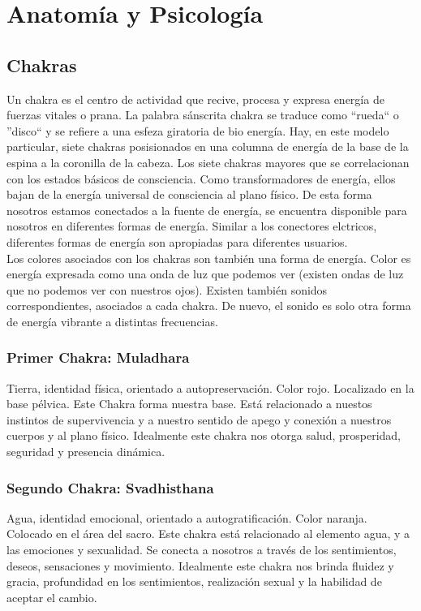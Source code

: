 \chapter{Anatomía y Psicología}
\section{Chakras}
Un chakra es el centro de actividad que recive, procesa y expresa energía de fuerzas vitales o prana. La palabra sánscrita chakra se traduce como ``rueda`` o ''disco`` y se refiere a una esfeza giratoria de bio energía. Hay, en este modelo particular, siete chakras posisionados en una columna de energía de la base de la espina a la coronilla de la cabeza. Los siete chakras mayores que se correlacionan con los estados básicos de consciencia. Como transformadores de energía, ellos bajan de la energía universal de consciencia al plano físico. De esta forma nosotros estamos conectados a la fuente de energía, se encuentra disponible para nosotros en diferentes formas de energía. Similar a los conectores elctricos, diferentes formas de energía son apropiadas para diferentes usuarios.\\
Los colores asociados con los chakras son tambi\'en una forma de energía. Color es energía expresada como una onda de luz que podemos ver (existen ondas de luz que no podemos ver con nuestros ojos). Existen tambi\'en sonidos correspondientes, asociados a cada chakra. De nuevo, el sonido es solo otra forma de energía vibrante a distintas frecuencias.\\

\subsection{Primer Chakra: Muladhara}
Tierra, identidad física, orientado a autopreservación. Color rojo. Localizado en la base p\'elvica. Este Chakra forma nuestra base. Está relacionado a nuestos instintos de supervivencia y a nuestro sentido de apego y conexión a nuestros cuerpos y al plano físico. Idealmente este chakra nos otorga salud, prosperidad, seguridad y presencia dinámica.\\
\subsection{Segundo Chakra: Svadhisthana}
Agua, identidad emocional, orientado a autogratificación. Color naranja. Colocado en el área del sacro. Este chakra está relacionado al elemento agua, y a las emociones y sexualidad. Se conecta a nosotros a trav\'es de los sentimientos, deseos, sensaciones y movimiento. Idealmente este chakra nos brinda fluidez y gracia, profundidad en los sentimientos, realización sexual y la habilidad de aceptar el cambio.
